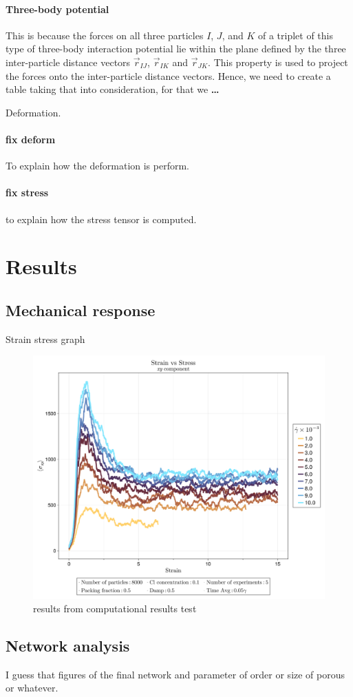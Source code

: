 \paragraph{Three-body potential}
This is because the forces on all three particles $I$, $J$, and $K$ of a triplet of this type of three-body interaction potential lie within the plane defined by the three inter-particle distance vectors $\vec{r}_{IJ}$, $\vec{r}_{IK}$ and $\vec{r}_{JK}$.
This property is used to project the forces onto the inter-particle distance vectors.
Hence, we need to create a table taking that into consideration, for that we \textbf{\ldots}

Deformation.

\paragraph{fix deform} To explain how the deformation is perform.

\paragraph{fix stress} to explain how the stress tensor is computed.

\section{Results}

\subsection{Mechanical response}

Strain stress graph

\begin{figure}[ht!]
    \centering
    \includegraphics[width=\textwidth]{figs/ComputaitonalResults/strain-vs-stressxy.png}
    \caption{results from computational results test}
\end{figure}


\subsection{Network analysis}

I guess that figures of the final network and parameter of order or size of porous or whatever.

